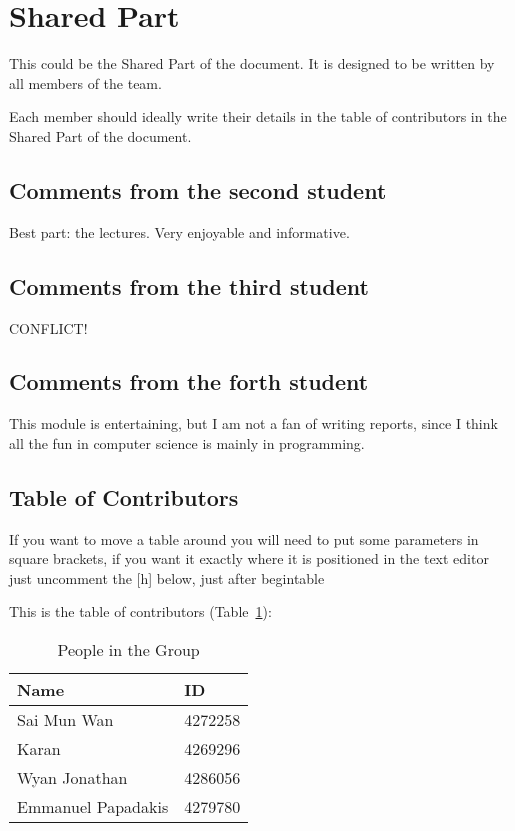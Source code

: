 \section{Shared Part}

This could be the Shared Part of the document. It is designed to be written by all members of the team.

Each member should ideally write their details in the table of contributors in the Shared Part of the document.



\subsection{Comments from the second student}
Best part: the lectures. Very enjoyable and informative. 
\subsection{Comments from the third student}
CONFLICT!

\subsection{Comments from the forth student}
This module is entertaining, but I am not a fan of writing reports, since I think all the fun in computer science is mainly in programming.

\subsection{Table of Contributors}


If you want to move a table around you will need to put some parameters in square brackets, if you want it exactly where it is positioned in the text editor just uncomment the [h] below, just after begin{table}

This is the table of contributors (Table~\ref{authors}):
\begin{table}%
\centering
\caption{People in the Group}
\label{authors}
\begin{tabular}{|l|l|}
\hline
\textbf{Name} & \textbf{ID} \\
\hline
Sai Mun Wan&4272258 \\
\hline
Karan&4269296 \\
\hline
Wyan Jonathan & 4286056 \\
\hline
Emmanuel Papadakis & 4279780 \\
\hline
\end{tabular}
\end{table}